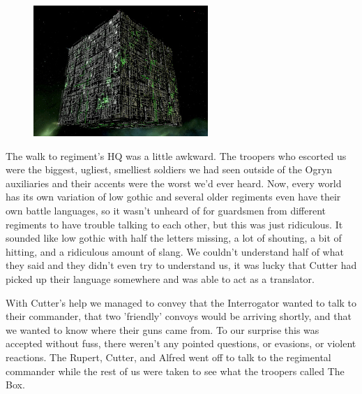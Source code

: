 \begin{figure}
	\begin{center}
		\includegraphics[width=\figwidth]{pics/4/18.png}
	\end{center}
\end{figure}
The walk to regiment's HQ was a little awkward. 
The troopers who escorted us were the biggest, ugliest, smelliest soldiers we had seen outside of the Ogryn auxiliaries and their accents were the worst we'd ever heard. 
Now, every world has its own variation of low gothic and several older regiments even have their own battle languages, so it wasn't unheard of for guardsmen from different regiments to have trouble talking to each other, but this was just ridiculous. 
It sounded like low gothic with half the letters missing, a lot of shouting, a bit of hitting, and a ridiculous amount of slang. 
We couldn't understand half of what they said and they didn't even try to understand us, it was lucky that Cutter had picked up their language somewhere and was able to act as a translator.

With Cutter's help we managed to convey that the Interrogator wanted to talk to their commander, that two 'friendly' convoys would be arriving shortly, and that we wanted to know where their guns came from.  
To our surprise this was accepted without fuss, there weren't any pointed questions, or evasions, or violent reactions. 
The Rupert, Cutter, and Alfred went off to talk to the regimental commander while the rest of us were taken to see what the troopers called The Box.


